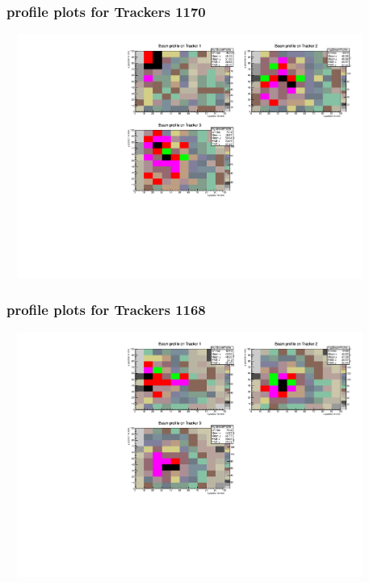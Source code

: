 \documentclass[slidestop,compress,mathserif]{beamer}
\begin{document}
\begin{frame}\frametitle{profile plots for Trackers 1170}
	 \includegraphics[width=12cm,height=8cm]{profile_plots_for_Trackers_1170.pdf}
\end{frame}
\begin{frame}\frametitle{profile plots for Trackers 1168}
	 \includegraphics[width=12cm,height=8cm]{profile_plots_for_Trackers_1168.pdf}
\end{frame}
\end{document}
